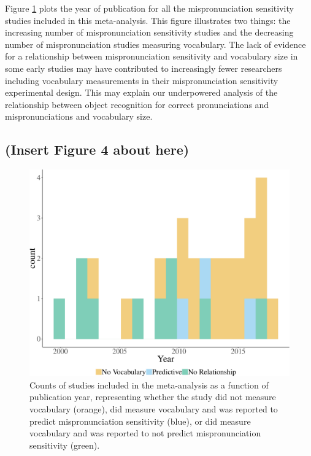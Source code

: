 \documentclass[man]{apa6}
\theoremstyle{definition}
\theoremstyle{definition}
\theoremstyle{definition}
\theoremstyle{remark}
\begin{document}
Figure \ref{fig:Vocab-describe1} plots the year of publication for all
the mispronunciation sensitivity studies included in this meta-analysis.
This figure illustrates two things: the increasing number of
mispronunciation sensitivity studies and the decreasing number of
mispronunciation studies measuring vocabulary. The lack of evidence for
a relationship between mispronunciation sensitivity and vocabulary size
in some early studies may have contributed to increasingly fewer
researchers including vocabulary measurements in their mispronunciation
sensitivity experimental design. This may explain our underpowered
analysis of the relationship between object recognition for correct
pronunciations and mispronunciations and vocabulary size.

\subsection{(Insert Figure 4 about
here)}\label{insert-figure-4-about-here}

\begin{figure}
\centering
\includegraphics{Paper_Analyses_files/figure-latex/Vocab-describe1-1.pdf}
\caption{\label{fig:Vocab-describe1}Counts of studies included in the
meta-analysis as a function of publication year, representing whether
the study did not measure vocabulary (orange), did measure vocabulary
and was reported to predict mispronunciation sensitivity (blue), or did
measure vocabulary and was reported to not predict mispronunciation
sensitivity (green).}
\end{figure}
\end{document}
